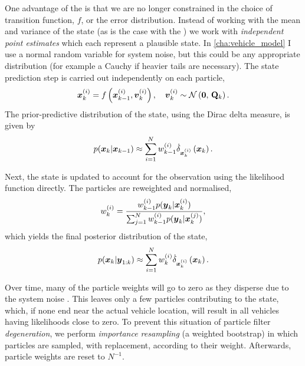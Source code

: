 One advantage of the \pf{} is that we are no longer constrained in the choice of transition function, $f$, or the error distribution. Instead of working with the mean and variance of the state (as is the case with the \kf{}) we work with \emph{independent point estimates} which each represent a plausible state. In \cref{cha:vehicle_model} I use a normal random variable for system noise, but this could be any appropriate distribution (for example a Cauchy if heavier tails are necessary). The state prediction step is carried out independently on each particle,
\begin{equation}
\label{eq:ch2:pf_predict_particle}
\bx\vi_k = f\left(\bx\vi_{k-1}, \boldsymbol{v}\vi_k\right),
\quad
\boldsymbol{v}\vi_k \sim \Normal{\boldsymbol{0}}{\mat{Q}_k}.
\end{equation}
The prior-predictive distribution of the state, using the Dirac delta measure, is given by
\begin{equation}
\label{eq:ch2:pf_predict_state}
p(\bx_k | \bx_{k-1}) \approx
\sum_{i=1}^\Np w\vi_{k-1} \DiracMeasure{\bx\vi_k}{\bx_k}.
\end{equation}


Next, the state is updated to account for the observation using the likelihood function directly. The particles are reweighted and normalised,
\begin{equation}
\label{eq:pf_reweight}
w\vi_k =
\frac{
    w\vi_{k-1} p(\boldsymbol{y}_k | \bx\vi_k)
}{
    \sum_{j=1}^\Np w\vi_{k-1} p(\boldsymbol{y}_k | \bx\vi[j]_k)
},
\end{equation}
which yields the final posterior distribution of the state,
\begin{equation}
\label{eq:pf_state_post}
p(\bx_{k} | \boldsymbol{y}_{1:k}) \approx
\sum_{i=1}^\Np w\vi_{k} \DiracMeasure{\bx\vi_{k}}{\bx_{k}}.
\end{equation}


Over time, many of the particle weights will go to zero as they disperse due to the system noise \citep{Doucet_2000}. This leaves only a few particles contributing to the state, which, if none end near the actual vehicle location, will result in all vehicles having likelihoods close to zero. To prevent this situation of particle filter \emph{degeneration}, we perform \emph{importance resampling} (a weighted bootstrap) in which particles are sampled, with replacement, according to their weight. Afterwards, particle weights are reset to $N^{-1}$.

